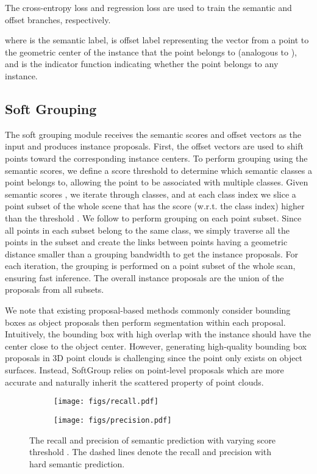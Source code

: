 \documentclass[10pt,twocolumn,letterpaper]{article}
\begin{document}
	The cross-entropy loss and  regression loss are used to train the semantic and offset branches, respectively.
	
	
	
	where  is the semantic label,  is offset label representing the vector from a point to the geometric center of the instance that the point belongs to (analogous to \cite{jiang2020pointgroup,chen2021hierarchical,liang2021instance}), and  is the indicator function indicating whether the point  belongs to any instance.
	\subsection{Soft Grouping}
	\label{ssec:softgroup}
	The soft grouping module receives the semantic scores and offset vectors as the input and produces instance proposals. First, the offset vectors are used to shift points toward the corresponding instance centers. To perform grouping using the semantic scores, we define a score threshold  to determine which semantic classes a point belongs to, allowing the point to be associated with multiple classes. Given semantic scores , we iterate through  classes, and at each class index we slice a point subset of the whole scene that has the score (w.r.t. the class index) higher than the threshold . We follow \cite{jiang2020pointgroup,chen2021hierarchical} to perform grouping on each point subset. Since all points in each subset belong to the same class, we simply traverse all the points in the subset and create the links between points having a geometric distance smaller than a grouping bandwidth  to get the instance proposals. For each iteration, the grouping is performed on a point subset of the whole scan, ensuring fast inference. The overall instance proposals are the union of the proposals from all subsets.
	
	We note that existing proposal-based methods \cite{hou20193d,yang2019learning,liu2020learning} commonly consider bounding boxes as object proposals then perform segmentation within each proposal. Intuitively, the bounding box with high overlap with the instance should have the center close to the object center. However, generating high-quality bounding box proposals in 3D point clouds is challenging since the point only exists on object surfaces. Instead, SoftGroup relies on point-level proposals which are more accurate and naturally inherit the scattered property of point clouds. 
	
	\begin{figure}
		\centering
		\begin{subfigure}{0.495\columnwidth}
			\texttt{[image: figs/recall.pdf]}
		\end{subfigure}
		\begin{subfigure}{0.495\columnwidth}
			\texttt{[image: figs/precision.pdf]}
		\end{subfigure}
		\caption{The recall and precision of semantic prediction with varying score threshold . The dashed lines denote the recall and precision with hard semantic prediction.}
		\label{fig:recall_precision}
	\end{figure}
	
\end{document}
